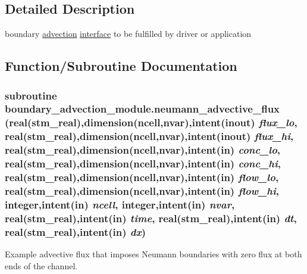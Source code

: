 \subsection{Detailed Description}
boundary \hyperlink{a00049}{advection} \hyperlink{a00003}{interface} to be fulfilled by driver or application 



\subsection{Function/Subroutine Documentation}
\hypertarget{a00050_be28f15b0eabbed1d1f745d2e27cbdc7}{
\subsubsection[{neumann\_\-advective\_\-flux}]{\setlength{\rightskip}{0pt plus 5cm}subroutine boundary\_\-advection\_\-module.neumann\_\-advective\_\-flux (real(stm\_\-real),dimension(ncell,nvar),intent(inout) {\em flux\_\-lo}, \/  real(stm\_\-real),dimension(ncell,nvar),intent(inout) {\em flux\_\-hi}, \/  real(stm\_\-real),dimension(ncell,nvar),intent(in) {\em conc\_\-lo}, \/  real(stm\_\-real),dimension(ncell,nvar),intent(in) {\em conc\_\-hi}, \/  real(stm\_\-real),dimension(ncell,nvar),intent(in) {\em flow\_\-lo}, \/  real(stm\_\-real),dimension(ncell,nvar),intent(in) {\em flow\_\-hi}, \/  integer,intent(in) {\em ncell}, \/  integer,intent(in) {\em nvar}, \/  real(stm\_\-real),intent(in) {\em time}, \/  real(stm\_\-real),intent(in) {\em dt}, \/  real(stm\_\-real),intent(in) {\em dx})}}
\label{a00050_be28f15b0eabbed1d1f745d2e27cbdc7}


Example advective flux that imposes Neumann boundaries with zero flux at both ends of the channel. 


